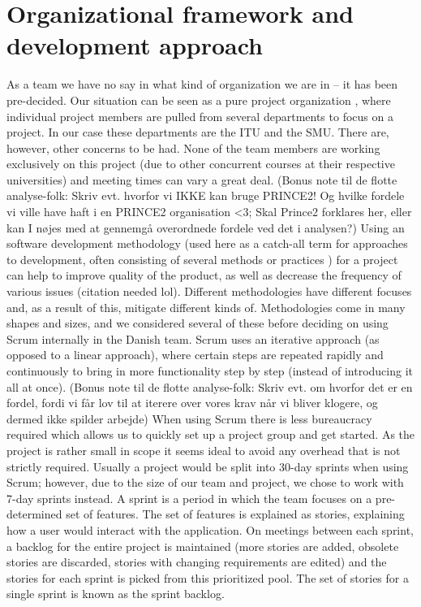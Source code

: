 \section{Organizational framework and development approach}
\label{sec:organizational}

As a team we have no say in what kind of organization we are in – it has been pre-decided. Our situation can be seen as a pure project organization , where individual project members are pulled from several departments to focus on a project. In our case these departments are the ITU and the SMU.
There are, however, other concerns to be had. None of the team members are working exclusively on this project (due to other concurrent courses at their respective universities) and meeting times can vary a great deal.
(Bonus note til de flotte analyse-folk: Skriv evt. hvorfor vi IKKE kan bruge PRINCE2! Og hvilke fordele vi ville have haft i en PRINCE2 organisation <3; Skal Prince2 forklares her, eller kan I nøjes med at gennemgå overordnede fordele ved det i analysen?)
Using an software development methodology (used here as a catch-all term for approaches to development, often consisting of several methods or practices ) for a project can help to improve quality of the product, as well as decrease the frequency of various issues (citation needed lol). Different methodologies have different focuses and, as a result of this, mitigate different kinds of. Methodologies come in many shapes and sizes, and we considered several of these before deciding on using Scrum internally in the Danish team.
Scrum uses an iterative approach (as opposed to a linear approach), where certain steps are repeated rapidly and continuously to bring in more functionality step by step (instead of introducing it all at once).
(Bonus note til de flotte analyse-folk: Skriv evt. om hvorfor det er en fordel, fordi vi får lov til at iterere over vores krav når vi bliver klogere, og dermed ikke spilder arbejde)
When using Scrum there is less bureaucracy required  which allows us to quickly set up a project group and get started. As the project is rather small in scope it seems ideal to avoid any overhead that is not strictly required.
Usually a project would be split into 30-day sprints when using Scrum; however, due to the size of our team and project, we chose to work with 7-day sprints instead. A sprint is a period in which the team focuses on a pre-determined set of features. The set of features is explained as stories, explaining how a user would interact with the application.
On meetings between each sprint, a backlog for the entire project is maintained (more stories are added, obsolete stories are discarded, stories with changing requirements are edited) and the stories for each sprint is picked from this prioritized pool. The set of stories for a single sprint is known as the sprint backlog.
